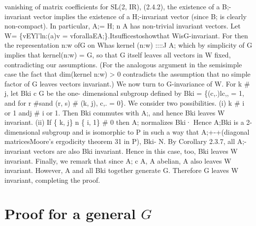 \documentclass[
  12pt
]{article}
\theoremstyle{break}
\theoremstyle{plain}
\begin{document}
  vanishing of matrix coefficients for SL(2, IR), (2.4.2), the existence
  of a B;-invariant vector implies the existence of a H;-invariant vector
  (since B; is clearly non-compact). In particular, A;= H; n A has
  non-trivial invariant vectors. Let W= \{vEYl'ln:(a)v =
  vforallaEA;\}.Itsufficestoshowthat WisG-invariant. For then the
  representation n:w ofG on Whas kernel (n:w) ::::J A; which by simplicity
  of G implies that kernel(n:w) = G, so that G itself leaves all vectors
  in W fixed, contradicting our assumptions. (For the analogous argument
  in the semisimple case the fact that dim(kernel n:w) \textgreater{} 0
  contradicts the assumption that no simple factor of G leaves vectors
  invariant.) We now turn to G-invariance of W. For k \# j, let Bki c G be
  the one- dimensional subgroup defined by Bki = \{(c,.)lc,, = 1, and for
  r \#sand (r, s) \# (k, j), c,. = 0\}. We consider two possibilities. (i)
  k \# i or 1 andj \# i or 1. Then Bki commutes with A;, and hence Bki
  leaves W invariant. (ii) If \{ k, j\} n \{ i, 1\} \# 0 then A;
  normalizes Bki· Hence A;Bki is a 2-dimensional subgroup and is
  isomorphic to P in such a way that A;+-+(diagonal matricesMoore's
  ergodicity theorem 31 in P), Bki- N. By Corollary 2.3.7, all
  A;-invariant vectors are also Bki invariant. Hence in this case, too,
  Bki leaves W invariant. Finally, we remark that since A; c A, A abelian,
  A also leaves W invariant. However, A and all Bki together generate G.
  Therefore G leaves W invariant, completing the proof.




\hypertarget{proof-for-a-general-G}{%
\section{Proof for a general \texorpdfstring{$G$}{G}}\label{proof-for-a-general-G}}
\end{document}
